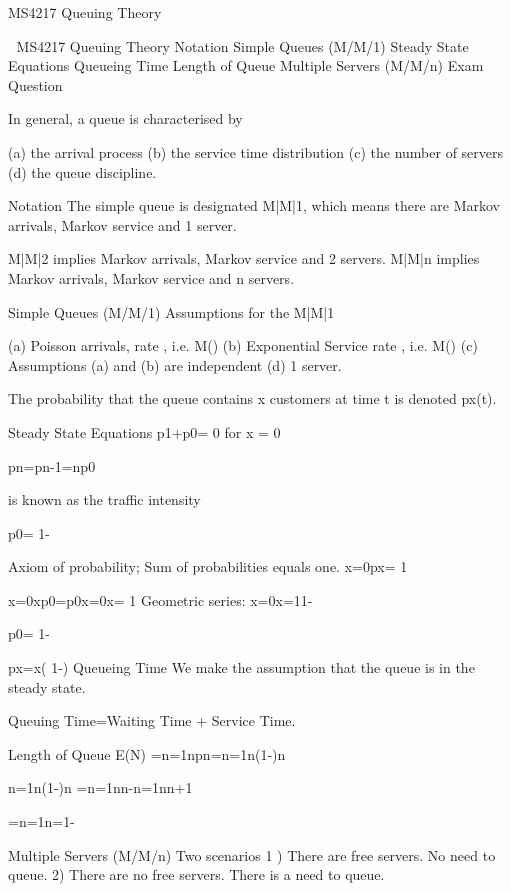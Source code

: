MS4217 Queuing Theory


MS4217 Queuing Theory
Notation
Simple Queues (M/M/1)
Steady State Equations
Queueing Time
Length of Queue
Multiple Servers (M/M/n)
Exam Question


In general, a queue is characterised by

(a) the arrival process
(b) the service time distribution
(c) the number of servers
(d) the queue discipline.


Notation
The simple queue is designated M|M|1, which means there are Markov arrivals, Markov service and 1 server. 

M|M|2 implies Markov arrivals, Markov service and 2 servers. M|M|n implies Markov arrivals, Markov service and n servers.


Simple Queues (M/M/1)
Assumptions for the M|M|1

(a) Poisson arrivals, rate , i.e. M()
(b) Exponential Service rate , i.e. M()
(c) Assumptions (a) and (b) are independent
(d) 1 server.

The probability that the queue contains x customers at time t is denoted px(t).

Steady State Equations
p1+p0= 0 for x = 0

pn=pn-1=np0

 is known as the traffic intensity

p0= 1-

		
Axiom of probability; Sum of probabilities equals one.
x=0px= 1  
	                       
		
x=0xp0=p0x=0x= 1
Geometric series: x=0x=11-

p0= 1-

px=x( 1-)
Queueing Time  
We make the assumption that the queue is in the steady state.

	Queuing Time=Waiting Time + Service Time.

Length of Queue
E(N) =n=1npn=n=1n(1-)n

		n=1n(1-)n =n=1nn-n=1nn+1
		
	      
		 =n=1n=1-



Multiple Servers (M/M/n)
Two scenarios
1 ) There are free servers. No need to queue.
2)  There are no free servers. There is a need to queue.



